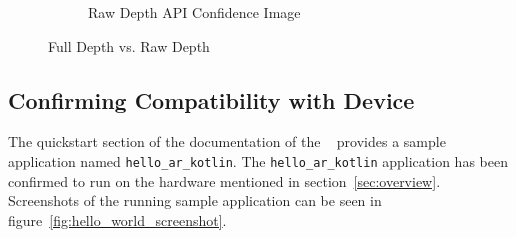 \begin{figure}[ht!]
\begin{subfigure}[b]{0.4\textwidth}
        \caption{Raw Depth API Confidence Image}
    \end{subfigure}%

    \caption{Full Depth vs. Raw Depth}
    \label{fig:depth-api-images}
\end{figure}

\subsection{Confirming Compatibility with Device}

The quickstart section of the documentation of the ~\parencite{arcore-depth-quickstart} provides a sample application named \texttt{hello\_ar\_kotlin}.
The \texttt{hello\_ar\_kotlin} application has been confirmed to run on the hardware mentioned in section~\ref{sec:overview}.
Screenshots of the running sample application can be seen in figure~\ref{fig:hello_world_screenshot}.


